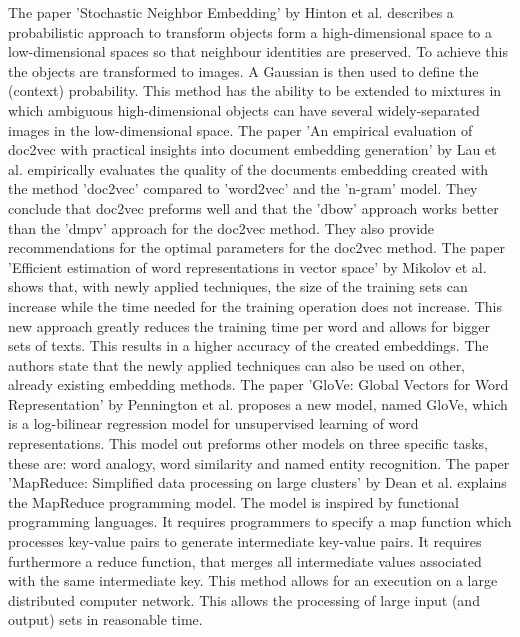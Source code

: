 \documentclass[../../Thesis.tex]{subfiles}
\begin{document}
The paper 'Stochastic Neighbor Embedding' by Hinton et al.\cite{hinton2003stochastic} describes a probabilistic approach to transform objects form a high-dimensional space to a low-dimensional spaces so that  neighbour identities are preserved. To achieve this the objects are transformed to images. A Gaussian is then used to define the (context) probability. This method has the ability to be extended to mixtures in which ambiguous high-dimensional objects can have several widely-separated images in the low-dimensional space.
The paper 'An empirical evaluation of doc2vec with practical insights into document embedding generation' by Lau et al.\cite{lau2016empirical} empirically evaluates the quality of the documents embedding created with the method 'doc2vec' compared to 'word2vec' and the 'n-gram' model. They conclude that doc2vec preforms well and that the 'dbow' approach works better than the 'dmpv' approach for the doc2vec method. They also provide recommendations for the optimal parameters for the doc2vec method.
The paper 'Efficient estimation of word representations in vector space' by Mikolov et al.\cite{mikolov2013efficient} 
shows that, with newly applied techniques, the size of the training sets can increase while the time needed for the training operation does not increase. This new approach greatly reduces the training time per word and allows for bigger sets of texts. This results in a higher accuracy of the created embeddings. The authors state that the newly applied techniques can also be used on other, already existing embedding methods. 
The paper 'GloVe: Global Vectors for Word Representation' by Pennington et al.\cite{pennington2014glove} proposes a new model, named GloVe, which is a log-bilinear regression model for unsupervised learning of word representations. This model out preforms other models on three specific tasks, these are: word analogy, word similarity and named entity recognition.
The paper 'MapReduce: Simplified data processing on large clusters' by Dean et al.\cite{dean2008mapreduce} explains the MapReduce programming model. The model is inspired by functional programming languages. It requires programmers to specify a map function which processes key-value pairs to generate intermediate key-value pairs. It requires furthermore a reduce function, that merges all intermediate values associated with the same intermediate key. This method allows for an execution on a large distributed computer network. This allows the processing of large input (and output) sets in reasonable time.
\end{document}
